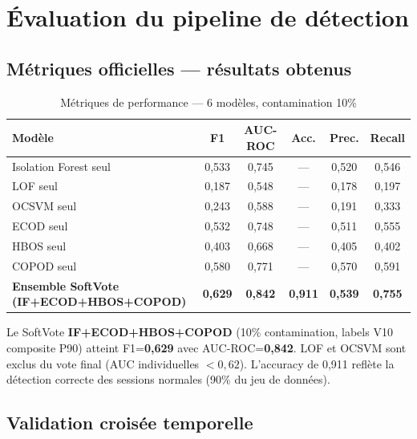 \documentclass[12pt,a4paper]{report}
\begin{document}
\section{Évaluation du pipeline de détection}

\subsection{Métriques officielles — résultats obtenus}

\begin{table}[h]
\centering
\caption{Métriques de performance — 6 modèles, contamination 10\%}
\label{tab:metriques_eval}
\begin{tabular}{lccccc}
\toprule
\textbf{Modèle} & \textbf{F1} & \textbf{AUC-ROC} & \textbf{Acc.} & \textbf{Prec.} & \textbf{Recall} \\
\midrule
Isolation Forest seul & 0,533 & 0,745 & — & 0,520 & 0,546 \\
LOF seul              & 0,187 & 0,548 & — & 0,178 & 0,197 \\
OCSVM seul            & 0,243 & 0,588 & — & 0,191 & 0,333 \\
ECOD seul             & 0,532 & 0,748 & — & 0,511 & 0,555 \\
HBOS seul             & 0,403 & 0,668 & — & 0,405 & 0,402 \\
COPOD seul            & 0,580 & 0,771 & — & 0,570 & 0,591 \\
\textbf{Ensemble SoftVote (IF+ECOD+HBOS+COPOD)} & \textbf{0,629} & \textbf{0,842} & \textbf{0,911} & \textbf{0,539} & \textbf{0,755} \\
\bottomrule
\end{tabular}
\end{table}

Le SoftVote \textbf{IF+ECOD+HBOS+COPOD} (10\% contamination, labels V10 composite P90)
atteint F1=\textbf{0,629} avec AUC-ROC=\textbf{0,842}. LOF et OCSVM sont exclus du vote
final (AUC individuelles $< 0{,}62$). L'accuracy de 0,911 reflète la détection correcte
des sessions normales (90\% du jeu de données).

\subsection{Validation croisée temporelle}
\end{document}
